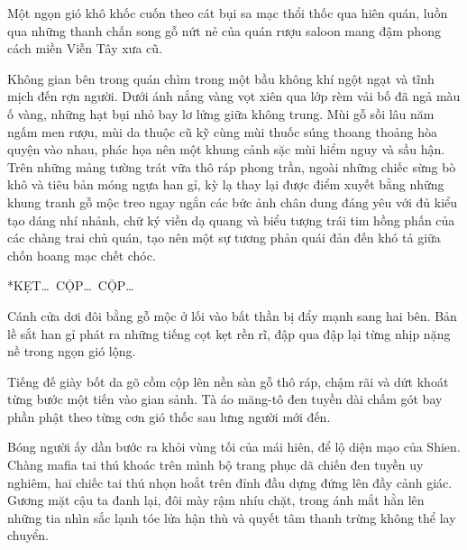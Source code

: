 \documentclass[../main.tex]{subfiles}
\begin{document}
\color{black}

\vspace{20pt}


Một ngọn gió khô khốc cuốn theo cát bụi sa mạc thổi thốc qua hiên quán, luồn qua những thanh chấn song gỗ nứt nẻ của quán rượu saloon mang đậm phong cách miền Viễn Tây xưa cũ.

Không gian bên trong quán chìm trong một bầu không khí ngột ngạt và tĩnh mịch đến rợn người. Dưới ánh nắng vàng vọt xiên qua lớp rèm vải bố đã ngả màu ố vàng, những hạt bụi nhỏ bay lơ lửng giữa không trung. Mùi gỗ sồi lâu năm ngấm men rượu, mùi da thuộc cũ kỹ cùng mùi thuốc súng thoang thoảng hòa quyện vào nhau, phác họa nên một khung cảnh sặc mùi hiểm nguy và sầu hận. Trên những mảng tường trát vữa thô ráp phong trần, ngoài những chiếc sừng bò khô và tiêu bản móng ngựa han gỉ, kỳ lạ thay lại được điểm xuyết bằng những khung tranh gỗ mộc treo ngay ngắn các bức ảnh chân dung đáng yêu với đủ kiểu tạo dáng nhí nhảnh, chữ ký viền dạ quang và biểu tượng trái tim hồng phấn của các chàng trai chủ quán, tạo nên một sự tương phản quái đản đến khó tả giữa chốn hoang mạc chết chóc.

*KẸT\dots\ CỘP\dots\ CỘP\dots*

Cánh cửa dơi đôi bằng gỗ mộc ở lối vào bất thần bị đẩy mạnh sang hai bên. Bản lề sắt han gỉ phát ra những tiếng cọt kẹt rền rĩ, đập qua đập lại từng nhịp nặng nề trong ngọn gió lộng.

Tiếng đế giày bốt da gõ cồm cộp lên nền sàn gỗ thô ráp, chậm rãi và dứt khoát từng bước một tiến vào gian sảnh. Tà áo măng-tô đen tuyền dài chấm gót bay phần phật theo từng cơn gió thốc sau lưng người mới đến.

Bóng người ấy dần bước ra khỏi vùng tối của mái hiên, để lộ diện mạo của Shien. Chàng mafia tai thú khoác trên mình bộ trang phục dã chiến đen tuyền uy nghiêm, hai chiếc tai thú nhọn hoắt trên đỉnh đầu dựng đứng lên đầy cảnh giác. Gương mặt cậu ta đanh lại, đôi mày rậm nhíu chặt, trong ánh mắt hằn lên những tia nhìn sắc lạnh tóe lửa hận thù và quyết tâm thanh trừng không thể lay chuyển.
\end{document}

